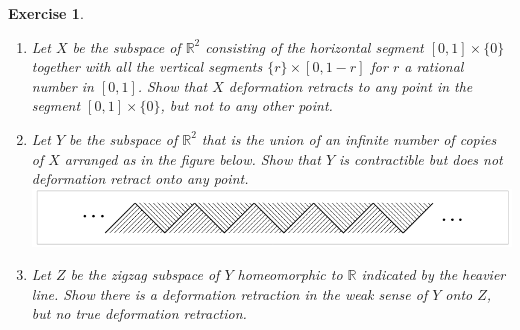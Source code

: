 \documentclass{article}
\newtheorem{exercise}[theorem]{Exercise}
\begin{document}
\begin{exercise}
\begin{enumerate}
\item[(a)] Let $X$ be the subspace of $\mathbb{R}^2$ consisting of the horizontal segment $[0,1]\times\{0\}$ together with all the vertical segments $\{r\}\times[0,1-r]$ for $r$ a rational number in $[0,1]$. Show that $X$ deformation retracts to any point in the segment $[0,1]\times\{0\}$, but not to any other point.
\item[(b)] Let $Y$ be the subspace of $\mathbb{R}^2$ that is the union of an infinite number of copies of $X$ arranged as in the figure below. Show that $Y$ is contractible but does not deformation retract onto any point.
\includegraphics[scale=0.5]{Screenshot 2025-07-20 at 19-46-35 AT.dvi - AT.pdf.png}
\item[(c)] Let $Z$ be the zigzag subspace of $Y$ homeomorphic to $\mathbb{R}$ indicated by the heavier line. Show there is a deformation retraction in the weak sense of $Y$ onto $Z$, but no true deformation retraction.
\end{enumerate}
\end{exercise}
\end{document}
